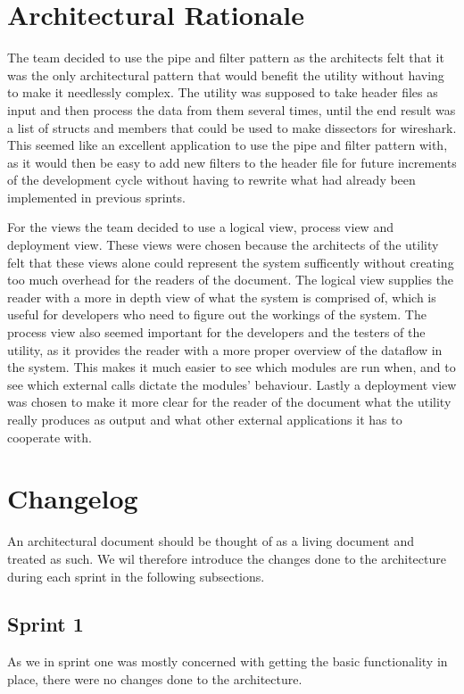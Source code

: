 \section{Architectural Rationale}
The team decided to use the pipe and filter pattern as the architects felt that it was the only architectural pattern that would benefit the \gls{utility} without having to make it needlessly complex. The \gls{utility} was supposed to take \gls{header} files as input and then process the data from them several times, until the end result was a list of \glspl{struct} and \glspl{member} that could be used to make \glspl{dissector} for \Gls{wireshark}. This seemed like an excellent application to use the pipe and filter pattern with, as it would then be easy to add new filters to the \gls{header} file for future increments of the development cycle without having to rewrite what had already been implemented in previous sprints.

For the views the team decided to use a logical view, process view and deployment view. These views were chosen because the architects of the \gls{utility} felt that these views alone could represent the system sufficently without creating too much overhead for the readers of the document. The logical view supplies the reader with a more in depth view of what the system is comprised of, which is useful for developers who need to figure out the workings of the system. The process view also seemed important for the developers and the testers of the \gls{utility}, as it provides the reader with a more proper overview of the dataflow in the system. This makes it much easier to see which modules are run when, and to see which external calls dictate the modules' behaviour. Lastly a deployment view was chosen to make it more clear for the reader of the document what the \gls{utility} really produces as output and what other external applications it has to cooperate with. 

\section{Changelog}
 An architectural document should be thought of as a living document and treated as such. We wil therefore introduce the changes done to the architecture during each sprint in the following subsections.

\subsection{Sprint 1}
As we in sprint one was mostly concerned with getting the basic functionality in place, there were no changes done to the architecture.

